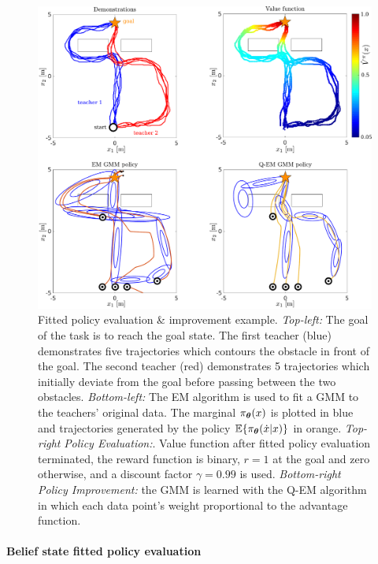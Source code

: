 \begin{figure}
 \centering
 \setlength\fboxsep{0pt}
  \setlength\fboxrule{0.25pt}
  \includegraphics[width=\textwidth]{./ch4-PiH/Figures/fpe_example.pdf}
 \caption{Fitted policy evaluation \& improvement example. 
  \textit{Top-left:} The goal of the task is to reach the goal state. The first teacher (blue) demonstrates 
  five trajectories which contours the obstacle in front of the goal. The second teacher (red) demonstrates 
  5 trajectories which initially deviate from the goal before passing between the two obstacles. 
  \textit{Bottom-left:} The EM algorithm is used to fit a GMM to the teachers' original data. 
  The marginal $\pi_{\boldsymbol{\theta}}(x)$ is plotted in blue and trajectories generated by the 
  policy $\mathbb{E}\{\pi_{\boldsymbol{\theta}}(\dot{x}|x)\}$ in orange. \textit{Top-right} \textit{Policy Evaluation:}.  
  Value function after fitted policy evaluation terminated, the reward function 
  is binary, $r=1$ at the goal and zero otherwise, and a discount factor $\gamma = 0.99$ is used.
  \textit{Bottom-right} \textit{Policy Improvement:} the GMM is learned with the Q-EM algorithm in which 
  each data point's weight proportional to the advantage function.
 }
  \label{fig:fpe_example}
\end{figure}

\paragraph{Belief state fitted policy evaluation}

